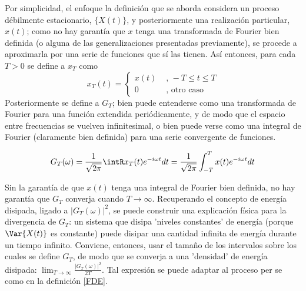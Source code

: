 

Por simplicidad, el enfoque la definici\'on que se aborda considera un proceso d\'ebilmente 
estacionario, $\{X(t)\}$, y posteriormente una realizaci\'on particular, $x(t)$; como no hay 
garant\'ia que $x$ tenga una transformada de Fourier bien definida (o alguna de las 
generalizaciones presentadas previamente), se procede a aproximarla por una serie de funciones que 
s\'i las tienen.
As\'i entonces, para cada $T>0$ se define a $x_T$ como
\begin{equation*}
x_T(t) = 
\begin{cases}
x(t) & \text{ , } -T\leq t \leq T \\
0 & \text{ , otro caso}
\end{cases}
\end{equation*}
Posteriormente se define a $G_T$; bien puede entenderse como una transformada de Fourier para una 
funci\'on extendida peri\'odicamente, y de modo que el espacio entre frecuencias se vuelven 
infinitesimal, o bien puede verse como una integral de Fourier (claramente bien definida) para una 
serie convergente de funciones.

\begin{equation*}
G_T (\omega) = \frac{1}{\sqrt{2 \pi}} \intR x_T(t) e^{-i \omega t} dt
= \frac{1}{\sqrt{2 \pi}} \int_{-T}^{T} x(t) e^{-i \omega t} dt
\end{equation*}

Sin la garant\'ia de que $x(t)$ tenga una integral de Fourier bien definida, no hay garant\'ia que 
$G_T$ converja cuando $T\rightarrow \infty$. Recuperando el concepto de energ\'ia disipada, ligado 
a $\left| G_T(\omega) \right|^{2}$, se puede construir una explicaci\'on f\'isica para la 
divergencia de $G_T$: un sistema que disipa 'niveles constantes' de energ\'ia (porque $\Var{X(t)}$ 
es constante) puede disipar una cantidad infinita de energ\'ia durante un tiempo infinito. 
Conviene, entonces, usar el tama\~no de los intervalos sobre los cuales se define $G_T$, de modo 
que se converja a una 'densidad' de energ\'ia disipada:
$\lim_{T\rightarrow{\infty}} \frac{ \left| G_T(\omega) \right|^{2}}{2 T}$.
Tal expresi\'on se puede adaptar al proceso per se como en la definici\'on \ref{FDE}.

